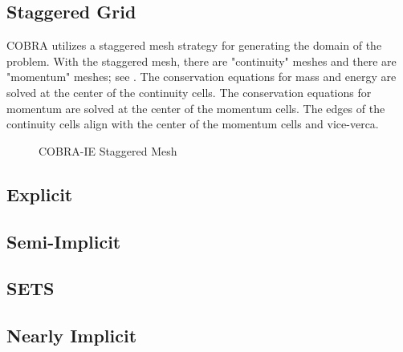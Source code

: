 \subsection{Staggered Grid}
\label{subsect:topology}


COBRA utilizes a staggered mesh strategy for generating the domain of the problem. 
With the staggered mesh, there are "continuity" meshes and there are "momentum" meshes; see .
The conservation equations for mass and energy are solved at the center of the continuity cells.
The conservation equations for momentum are solved at the center of the momentum cells.
The edges of the continuity cells align with the center of the momentum cells and vice-verca.

\begin{figure}[ht]
\caption{COBRA-IE Staggered Mesh}
\label{fig:staggered_mesh}
\begin{center}
\end{center}
\end{figure}



\subsection{Explicit}
\label{subsect:numerics_explicit}


\subsection{Semi-Implicit}
\label{subsect:numerics_semi_implicit}


\subsection{SETS}
\label{subsect:numerics_sets}

\subsection{Nearly Implicit}
\label{subsect:numerics_nearly_implicit}

